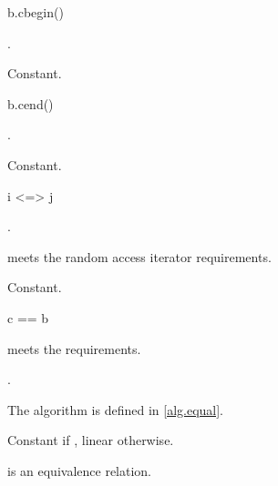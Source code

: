 %
\begin{itemdecl}
b.cbegin()
\end{itemdecl}

\begin{itemdescr}
\pnum
\result
{}.

\pnum
\returns
{}

\pnum
\complexity
Constant.
\end{itemdescr}

%
\begin{itemdecl}
b.cend()
\end{itemdecl}

\begin{itemdescr}
\pnum
\result
{}.

\pnum
\returns
{}

\pnum
\complexity
Constant.
\end{itemdescr}

\begin{itemdecl}
i <=> j
\end{itemdecl}

\begin{itemdescr}
\pnum
\result
{}.

\pnum
\constraints
{} meets the random access iterator requirements.

\pnum
\complexity
Constant.
\end{itemdescr}

%
\begin{itemdecl}
c == b
\end{itemdecl}

\begin{itemdescr}
\pnum
\expects
{} meets the  requirements.

\pnum
\result
{}.

\pnum
\returns
{}

\begin{note}
The algorithm  is defined in \ref{alg.equal}.
\end{note}

\pnum
\complexity
Constant if , linear otherwise.

\pnum
\remarks
\tcode{==} is an equivalence relation.
\end{itemdescr}

